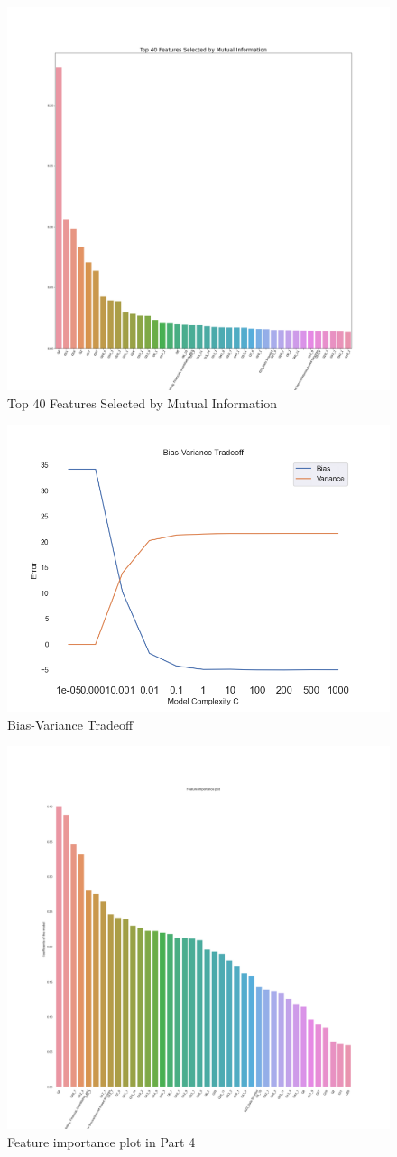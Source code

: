 \documentclass[10pt,onecolumn,letterpaper]{article}
\begin{document}
\begin{figure}[htbp]
  \centering
  \includegraphics[width=.75\textwidth]{f25.png}
  \caption{Top 40 Features Selected by Mutual Information}
\end{figure}

\begin{figure}[htbp]
  \centering
  \includegraphics[width=.75\textwidth]{f6.png}
  \caption{Bias-Variance Tradeoff}
\end{figure}

\begin{figure}[htbp]
  \centering
  \includegraphics[width=.75\textwidth]{f7.png}
  \caption{Feature importance plot in Part 4}
\end{figure}
\end{document}
